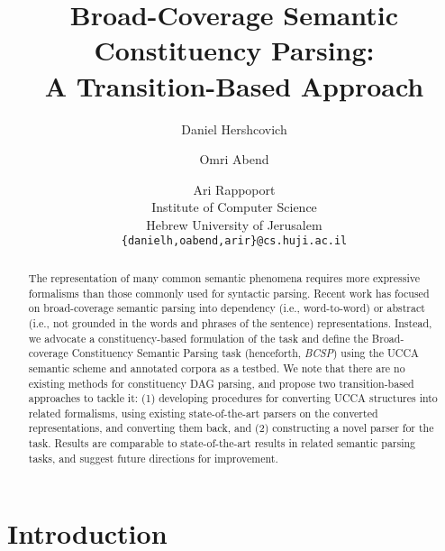\documentclass[11pt]{article}
\title{Broad-Coverage Semantic Constituency Parsing: \\
A Transition-Based Approach}
\author{Daniel Hershcovich \and Omri Abend \and Ari Rappoport \\
  Institute of Computer Science \\
  Hebrew University of Jerusalem \\
  {\tt \{danielh,oabend,arir\}@cs.huji.ac.il}
}
\date{}
\begin{document}
\maketitle

\begin{abstract}

  The representation of many common semantic phenomena requires
  more expressive formalisms than those commonly used for syntactic parsing.
  Recent work has focused on broad-coverage semantic parsing into dependency
  (i.e., word-to-word) or abstract (i.e., not grounded in the words and phrases of
  the sentence) representations.
  Instead, we advocate a constituency-based formulation of the
  task and define the Broad-coverage Constituency Semantic Parsing task
  (henceforth, {\it BCSP}) using the UCCA semantic scheme and
  annotated corpora as a testbed.
  We note that there are no existing methods for constituency DAG parsing,
  and propose two transition-based approaches to tackle it:
  (1) developing procedures for converting UCCA structures into related
  formalisms, using existing state-of-the-art parsers on the converted representations,
  and converting them back, and (2) constructing a novel parser for the task.
  Results are comparable to state-of-the-art results in related
  semantic parsing tasks, and suggest future directions for improvement.
  
  
\end{abstract}



\section{Introduction}
\end{document}

